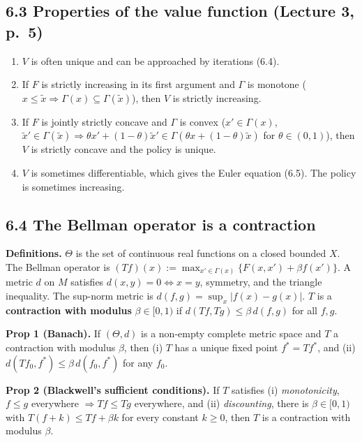 \documentclass[12pt]{article}
\begin{document}
\subsection*{6.3 Properties of the value function (Lecture 3, p.~5)}
\begin{enumerate}
\item $V$ is often unique and can be approached by iterations (6.4).
\item If $F$ is strictly increasing in its first argument and $\Gamma$ is monotone ($x\le\tilde x\Rightarrow\Gamma(x)\subseteq\Gamma(\tilde x)$), then $V$ is strictly increasing.
\item If $F$ is jointly strictly concave and $\Gamma$ is convex ($x'\in\Gamma(x)$, $\tilde x'\in\Gamma(\tilde x)\Rightarrow\theta x'+(1-\theta)\tilde x'\in\Gamma(\theta x+(1-\theta)\tilde x)$ for $\theta\in(0,1)$), then $V$ is strictly concave and the policy is unique.
\item $V$ is sometimes differentiable, which gives the Euler equation (6.5). The policy is sometimes increasing.
\end{enumerate}

\subsection*{6.4 The Bellman operator is a contraction}
\textbf{Definitions.} $\Theta$ is the set of continuous real functions on a closed
bounded $X$. The Bellman operator is $(Tf)(x):=\max_{x'\in\Gamma(x)}\{F(x,x')+\beta f(x')\}$.
A metric $d$ on $M$ satisfies $d(x,y)=0\iff x=y$, symmetry, and the triangle
inequality. The sup-norm metric is $d(f,g)=\sup_x|f(x)-g(x)|$. $T$ is a
\textbf{contraction with modulus} $\beta\in[0,1)$ if $d(Tf,Tg)\le\beta\,d(f,g)$ for all $f,g$.

\textbf{Prop 1 (Banach).} If $(\Theta,d)$ is a non-empty complete metric space and $T$ a contraction with modulus $\beta$, then (i) $T$ has a unique fixed point $f^*=Tf^*$, and (ii) $d(Tf_0,f^*)\le\beta\,d(f_0,f^*)$ for any $f_0$.

\textbf{Prop 2 (Blackwell's sufficient conditions).} If $T$ satisfies
(i) \emph{monotonicity}, $f\le g$ everywhere $\Rightarrow Tf\le Tg$ everywhere, and
(ii) \emph{discounting}, there is $\beta\in[0,1)$ with $T(f+k)\le Tf+\beta k$ for every constant $k\ge0$,
then $T$ is a contraction with modulus $\beta$.
\end{document}
